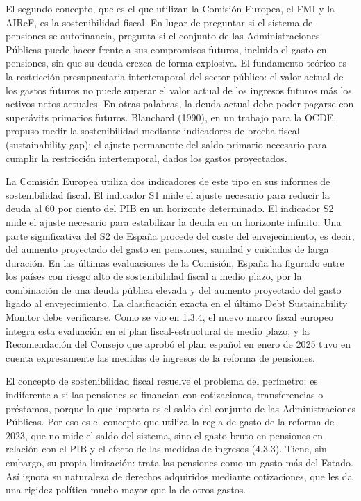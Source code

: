 \documentclass[10pt,a4paper]{article}
\begin{document}
El segundo concepto, que es el que utilizan la Comisión Europea, el FMI y la AIReF, es la sostenibilidad fiscal. En lugar de preguntar si el sistema de pensiones se autofinancia, pregunta si el conjunto de las Administraciones Públicas puede hacer frente a sus compromisos futuros, incluido el gasto en pensiones, sin que su deuda crezca de forma explosiva. El fundamento teórico es la restricción presupuestaria intertemporal del sector público: el valor actual de los gastos futuros no puede superar el valor actual de los ingresos futuros más los activos netos actuales. En otras palabras, la deuda actual debe poder pagarse con superávits primarios futuros. Blanchard (1990), en un trabajo para la OCDE, propuso medir la sostenibilidad mediante indicadores de brecha fiscal (sustainability gap): el ajuste permanente del saldo primario necesario para cumplir la restricción intertemporal, dados los gastos proyectados.

La Comisión Europea utiliza dos indicadores de este tipo en sus informes de sostenibilidad fiscal. El indicador S1 mide el ajuste necesario para reducir la deuda al 60 por ciento del PIB en un horizonte determinado. El indicador S2 mide el ajuste necesario para estabilizar la deuda en un horizonte infinito. Una parte significativa del S2 de España procede del coste del envejecimiento, es decir, del aumento proyectado del gasto en pensiones, sanidad y cuidados de larga duración. En las últimas evaluaciones de la Comisión, España ha figurado entre los países con riesgo alto de sostenibilidad fiscal a medio plazo, por la combinación de una deuda pública elevada y del aumento proyectado del gasto ligado al envejecimiento. La clasificación exacta en el último Debt Sustainability Monitor debe verificarse. Como se vio en 1.3.4, el nuevo marco fiscal europeo integra esta evaluación en el plan fiscal-estructural de medio plazo, y la Recomendación del Consejo que aprobó el plan español en enero de 2025 tuvo en cuenta expresamente las medidas de ingresos de la reforma de pensiones.

El concepto de sostenibilidad fiscal resuelve el problema del perímetro: es indiferente a si las pensiones se financian con cotizaciones, transferencias o préstamos, porque lo que importa es el saldo del conjunto de las Administraciones Públicas. Por eso es el concepto que utiliza la regla de gasto de la reforma de 2023, que no mide el saldo del sistema, sino el gasto bruto en pensiones en relación con el PIB y el efecto de las medidas de ingresos (4.3.3). Tiene, sin embargo, su propia limitación: trata las pensiones como un gasto más del Estado. Así ignora su naturaleza de derechos adquiridos mediante cotizaciones, que les da una rigidez política mucho mayor que la de otros gastos.
\end{document}
